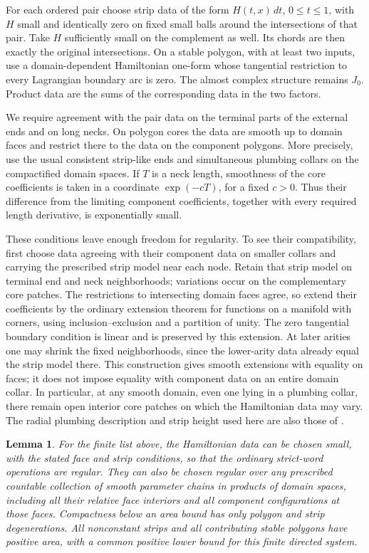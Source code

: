 \documentclass[11pt]{article}
\numberwithin{equation}{section}
\newtheorem{lemma}[theorem]{Lemma}
\theoremstyle{definition}
\theoremstyle{remark}
\begin{document}
For each ordered pair choose strip data of the form $H(t,x)\,dt$,
$0\leq t\leq1$, with $H$ small and identically zero on fixed small
balls around the intersections of that pair.  Take $H$ sufficiently
small on the complement as well.  Its chords are then exactly the
original intersections.  On a stable polygon, with at least two
inputs, use a domain-dependent Hamiltonian one-form whose tangential
restriction to every Lagrangian boundary arc is zero.  The almost
complex structure remains $J_0$.  Product data are the sums of the
corresponding data in the two factors.

We require agreement with the pair data on the terminal parts of the
external ends and on long necks.  On polygon cores the data are smooth
up to domain faces and restrict there to the data on the component
polygons.  More precisely, use the usual consistent strip-like ends
and simultaneous plumbing collars on the compactified domain spaces.
If $T$ is a neck length, smoothness of the core coefficients is taken
in a coordinate $\exp(-cT)$, for a fixed $c>0$.  Thus their difference
from the limiting component coefficients, together with every
required length derivative, is exponentially small.

These conditions leave enough freedom for regularity.  To see their
compatibility, first choose data agreeing with their component data
on smaller collars and carrying the prescribed strip model near each
node.  Retain that strip model on terminal end and neck
neighborhoods; variations occur on the complementary core patches.
The restrictions to intersecting domain faces agree, so extend their
coefficients by the ordinary extension theorem for functions on a
manifold with corners, using inclusion--exclusion and a partition of
unity.  The zero tangential boundary condition is linear and is
preserved by this extension.  At later arities one may shrink the
fixed neighborhoods, since the lower-arity data already equal the
strip model there.  This construction gives smooth extensions with
equality on faces; it does not impose equality with component data on
an entire domain collar.  In particular, at any smooth domain, even
one lying in a plumbing collar, there remain open interior core
patches on which the Hamiltonian data may vary.  The radial
plumbing description and strip height used here are also those of
\cite[Proposition~7.5]{A8}.

\begin{lemma}
\label{comp:regularity}
For the finite list above, the Hamiltonian data can be chosen small,
with the stated face and strip conditions, so that the ordinary
strict-word operations are regular.  They can also be chosen regular
over any prescribed countable collection of smooth parameter chains
in products of domain spaces, including all their relative face
interiors and all component configurations at those faces.
Compactness below an area bound has only polygon and strip
degenerations.  All nonconstant strips and all contributing stable
polygons have positive area, with a common positive lower bound for
this finite directed system.
\end{lemma}
\end{document}
